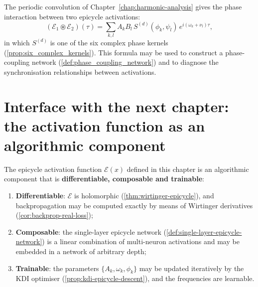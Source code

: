 \begin{remark}\label{rem:periodic-convolution-activation}
The periodic convolution of Chapter~\ref{chap:harmonic-analysis} gives the phase interaction between two epicycle activations:
\[
(\mathcal E_1\circledast\mathcal E_2)(\tau)=\sum_{k,l}A_kB_l\,S^{(d)}(\phi_k,\psi_l)\,e^{i(\omega_k+\nu_l)\tau},
\]
in which $S^{(d)}$ is one of the six complex phase kernels (\cref{prop:six_complex_kernels}). This formula may be used to construct a phase-coupling network (\cref{def:phase_coupling_network}) and to diagnose the synchronisation relationships between activations.
\end{remark}

\section{Interface with the next chapter: the activation function as an algorithmic component}
\label{sec:activation_to_algorithm_interface}

\begin{remark}\label{rem:activation_as_algorithm_component}
The epicycle activation function $\mathcal E(x)$ defined in this chapter is an algorithmic component that is \textbf{differentiable, composable and trainable}:
\begin{enumerate}[label=(\roman*)]
    \item \textbf{Differentiable}: $\mathcal E$ is holomorphic (\cref{thm:wirtinger-epicycle}), and backpropagation may be computed exactly by means of Wirtinger derivatives (\cref{cor:backprop-real-loss});
    \item \textbf{Composable}: the single-layer epicycle network (\cref{def:single-layer-epicycle-network}) is a linear combination of multi-neuron activations and may be embedded in a network of arbitrary depth;
    \item \textbf{Trainable}: the parameters $\{A_k,\omega_k,\phi_k\}$ may be updated iteratively by the KDI optimiser (\cref{prop:kdi-epicycle-descent}), and the frequencies are learnable.
\end{enumerate}
\end{remark}

